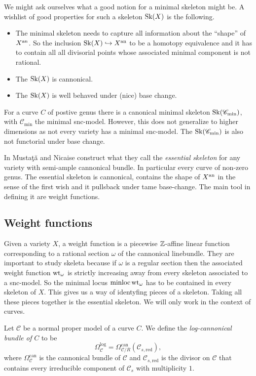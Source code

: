 We might ask ourselves what a good notion for a minimal skeleton might be. 
A wishlist of good properties for such a skeleton $\operatorname{Sk}(X)$ is the following. 
\begin{itemize}
	\item The minimal skeleton needs to capture all information about the ``shape'' of $X{}^{\text{an}}$. So the inclusion $\operatorname{Sk}(X) \hookrightarrow X{}^{\text{an}}$ to be a homotopy equivalence and it has to contain all all divisorial points whose associated minimal component is not rational.
	\item The $\operatorname{Sk}(X)$ is cannonical. 
	\item The $\operatorname{Sk}(X)$ is well behaved under (nice) base change. 
\end{itemize}
For a curve $C$ of postive genus there is a canonical minimal skeleton $\operatorname{Sk}(\mathscr C_\text{min} )$, with $\mathscr C_\text{min} $ the minimal snc-model.
However, this does not generalize to higher dimensions as not every variety has a minimal snc-model. 
The $\operatorname{Sk}(\mathscr C_\text{min})$ is also not functorial under base change. 

In \cite{mustataWeightFunctionsNonArchimedean2015} Mustaţă and Nicaise construct what they call the \emph{essential skeleton} for any variety with semi-ample cannonical bundle.
In particular every curve of non-zero genus. 
The essential skeleton is cannonical, contains the shape of $X{}^{\text{an}}$ in the sense of the first wish and it pullsback under tame base-change.  
The main tool in defining it are weight functions. 

\subsection{Weight functions} \label{sec:weight_functions}
Given a variety $X$, a weight function is a piecewise $\mathbb{Z}$-affine linear function corresponding to a rational section $\omega$ of the cannonical linebundle. 
They are important to study skeleta because if $\omega$ is a regular section then the associated weight function $\operatorname{wt}_\omega$ is strictly increasing away from every skeleton associated to a snc-model. 
So the minimal locus $\operatorname{minloc} \operatorname{wt}_\omega$ has to be contained in every skeleton of $X$. 
This gives us a way of identyfing pieces of a skeleton. 
Taking all these pieces together is the essential skeleton. 
We will only work in the context of curves. 

\begin{definition}\label{def:log_cannonical_bundle}
	Let  $\mathscr C$ be a normal proper model of a curve $C $. 
	We define the \emph{log-cannonical bundle of $C$} to be \[
		\Omega_{\mathscr C}^{\text{log}}  = \Omega_{\mathscr C / R}^{\text{can}}(\mathscr C_{s, \text{red}})
	,\] 
	where $\Omega_{\mathscr C} ^{\text{can}}$ is the cannonical bundle of $\mathscr C$ and $\mathscr C_{s, \text{red}}$ is the divisor on $\mathscr C$ that contains every irreducible component of $\mathscr C_s$ with multiplicity $1$.  
\end{definition}

